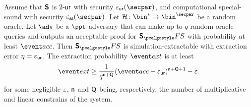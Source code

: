 \documentclass[runningheads,11pt]{llncs}
\theoremstyle{definition} \newtheorem{definition}[theorem]{Definition}
\begin{document}
\begin{corollary}
  \label{thm:sonicprotfs_se}
  Assume that $\bm{\mathsf{S}}$ is ${2\text{-}\mathsf{ur}}$ with security $\epsur(\secpar)$, and
  computational special-sound with security $\epsss(\secpar)$. Let $\ro\colon
  \bin^* \to \bin^\secpar$ be a random oracle. Let $\advse$ be a $\ppt$
  adversary that can make up to $q$ random oracle queries and outputs an
  acceptable proof for $\sonicprotfs$ with probability at least $\accProb$. Then
  $\sonicprotfs$ is simulation-extractable with extraction error $\eta =
  \varepsilon_{\mathsf{ur}}$. The extraction probability $\extProb$ is at least
\[
		\extProb  \geq \frac{1}{q^{\multconstr + \linconstr}} (\accProb - \epsur)^{\multconstr +
		\linconstr + 1} - \eps.
	\]
	for some negligible $\varepsilon$, $\mathsf{n}$ and $\mathsf{Q}$ being,
  respectively, the number of multiplicative and linear constrains of the system.
\end{corollary}


\end{document}
